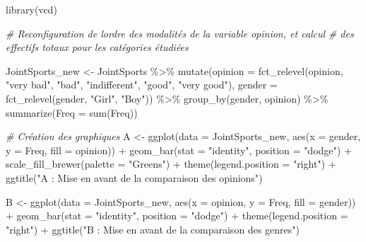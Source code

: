\documentclass[
]{book}
\newenvironment{Shaded}{\begin{snugshade}}{\end{snugshade}}
\newcommand{\AttributeTok}[1]{\textcolor[rgb]{0.77,0.63,0.00}{#1}}
\newcommand{\CommentTok}[1]{\textcolor[rgb]{0.56,0.35,0.01}{\textit{#1}}}
\newcommand{\FunctionTok}[1]{\textcolor[rgb]{0.00,0.00,0.00}{#1}}
\newcommand{\NormalTok}[1]{#1}
\newcommand{\OtherTok}[1]{\textcolor[rgb]{0.56,0.35,0.01}{#1}}
\newcommand{\SpecialCharTok}[1]{\textcolor[rgb]{0.00,0.00,0.00}{#1}}
\newcommand{\StringTok}[1]{\textcolor[rgb]{0.31,0.60,0.02}{#1}}
\begin{document}
\begin{Shaded}
\begin{Highlighting}[]
\FunctionTok{library}\NormalTok{(vcd)}

\CommentTok{\# Reconfiguration de l\textquotesingle{}ordre des modalités de la variable opinion, et calcul }
\CommentTok{\# des effectifs totaux pour les catégories étudiées}

\NormalTok{JointSports\_new }\OtherTok{\textless{}{-}} 
\NormalTok{  JointSports }\SpecialCharTok{\%\textgreater{}\%}
  \FunctionTok{mutate}\NormalTok{(}\AttributeTok{opinion =} \FunctionTok{fct\_relevel}\NormalTok{(opinion, }
                               \StringTok{"very bad"}\NormalTok{, }
                               \StringTok{"bad"}\NormalTok{, }
                               \StringTok{"indifferent"}\NormalTok{, }
                               \StringTok{"good"}\NormalTok{, }
                               \StringTok{"very good"}\NormalTok{),}
         \AttributeTok{gender =} \FunctionTok{fct\_relevel}\NormalTok{(gender, }\StringTok{"Girl"}\NormalTok{, }\StringTok{"Boy"}\NormalTok{)) }\SpecialCharTok{\%\textgreater{}\%}
  \FunctionTok{group\_by}\NormalTok{(gender, opinion) }\SpecialCharTok{\%\textgreater{}\%}
  \FunctionTok{summarize}\NormalTok{(}\AttributeTok{Freq =} \FunctionTok{sum}\NormalTok{(Freq))}

\CommentTok{\# Création des graphiques}
\NormalTok{A }\OtherTok{\textless{}{-}} 
  \FunctionTok{ggplot}\NormalTok{(}\AttributeTok{data =}\NormalTok{ JointSports\_new, }\FunctionTok{aes}\NormalTok{(}\AttributeTok{x =}\NormalTok{ gender, }\AttributeTok{y =}\NormalTok{ Freq, }\AttributeTok{fill =}\NormalTok{ opinion)) }\SpecialCharTok{+}
  \FunctionTok{geom\_bar}\NormalTok{(}\AttributeTok{stat =} \StringTok{"identity"}\NormalTok{,  }\AttributeTok{position =} \StringTok{"dodge"}\NormalTok{) }\SpecialCharTok{+}
  \FunctionTok{scale\_fill\_brewer}\NormalTok{(}\AttributeTok{palette =} \StringTok{"Greens"}\NormalTok{) }\SpecialCharTok{+}
  \FunctionTok{theme}\NormalTok{(}\AttributeTok{legend.position =} \StringTok{"right"}\NormalTok{) }\SpecialCharTok{+}
  \FunctionTok{ggtitle}\NormalTok{(}\StringTok{"A : Mise en avant de la comparaison des opinions"}\NormalTok{)}

\NormalTok{B }\OtherTok{\textless{}{-}} 
  \FunctionTok{ggplot}\NormalTok{(}\AttributeTok{data =}\NormalTok{ JointSports\_new, }\FunctionTok{aes}\NormalTok{(}\AttributeTok{x =}\NormalTok{ opinion, }\AttributeTok{y =}\NormalTok{ Freq, }\AttributeTok{fill =}\NormalTok{ gender)) }\SpecialCharTok{+}
  \FunctionTok{geom\_bar}\NormalTok{(}\AttributeTok{stat =} \StringTok{"identity"}\NormalTok{,  }\AttributeTok{position =} \StringTok{"dodge"}\NormalTok{) }\SpecialCharTok{+}
  \FunctionTok{theme}\NormalTok{(}\AttributeTok{legend.position =} \StringTok{"right"}\NormalTok{) }\SpecialCharTok{+}  
  \FunctionTok{ggtitle}\NormalTok{(}\StringTok{"B : Mise en avant de la comparaison des genres"}\NormalTok{)}
\end{Highlighting}
\end{Shaded}
\end{document}

